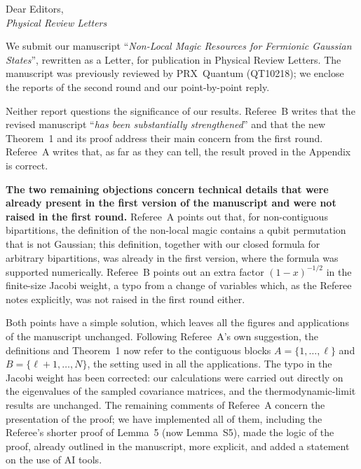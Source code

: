 \documentclass[11pt]{article}
\renewcommand{\emph}[1]{\textbf{#1}}
\begin{document}
\sloppy


\noindent
Dear Editors,\\
\noindent \textit{Physical Review Letters}\\

\bigskip

\noindent
We submit our manuscript ``\textit{Non-Local Magic Resources for Fermionic Gaussian States}'', rewritten as a Letter, for publication in Physical Review Letters. The manuscript was previously reviewed by PRX~Quantum (QT10218); we enclose the reports of the second round and our point-by-point reply.

\medskip
\noindent
Neither report questions the significance of our results. Referee~B writes that the revised manuscript ``\textit{has been substantially strengthened}'' and that the new Theorem~1 and its proof address their main concern from the first round. Referee~A writes that, as far as they can tell, the result proved in the Appendix is correct.

\medskip
\noindent
\emph{The two remaining objections concern technical details that were already present in the first version of the manuscript and were not raised in the first round.} Referee~A points out that, for non-contiguous bipartitions, the definition of the non-local magic contains a qubit permutation that is not Gaussian; this definition, together with our closed formula for arbitrary bipartitions, was already in the first version, where the formula was supported numerically. Referee~B points out an extra factor $(1-x)^{-1/2}$ in the finite-size Jacobi weight, a typo from a change of variables which, as the Referee notes explicitly, was not raised in the first round either.

\medskip
\noindent
Both points have a simple solution, which leaves all the figures and applications of the manuscript unchanged. Following Referee~A's own suggestion, the definitions and Theorem~1 now refer to the contiguous blocks $A=\{1,\dots,\ell\}$ and $B=\{\ell+1,\dots,N\}$, the setting used in all the applications. The typo in the Jacobi weight has been corrected: our calculations were carried out directly on the eigenvalues of the sampled covariance matrices, and the thermodynamic-limit results are unchanged. The remaining comments of Referee~A concern the presentation of the proof; we have implemented all of them, including the Referee's shorter proof of Lemma~5 (now Lemma~S5), made the logic of the proof, already outlined in the manuscript, more explicit, and added a statement on the use of AI tools.
\end{document}
